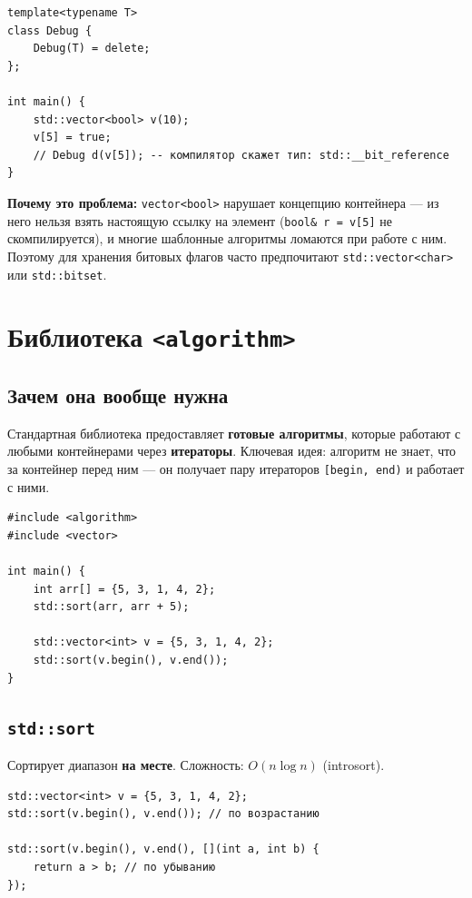 \documentclass[a4paper,12pt]{article}
\begin{document}
\begin{lstlisting}
template<typename T>
class Debug {
    Debug(T) = delete;
};

int main() {
    std::vector<bool> v(10);
    v[5] = true;
    // Debug d(v[5]); -- компилятор скажет тип: std::__bit_reference
}
\end{lstlisting}

\textbf{Почему это проблема:} \texttt{vector<bool>} нарушает концепцию
контейнера --- из него нельзя взять настоящую ссылку на элемент
(\texttt{bool\& r = v[5]} не скомпилируется), и многие шаблонные
алгоритмы ломаются при работе с ним. Поэтому для хранения битовых флагов
часто предпочитают \texttt{std::vector<char>} или \texttt{std::bitset}.

\newpage
\section{Библиотека \texttt{<algorithm>}}

\subsection{Зачем она вообще нужна}

Стандартная библиотека предоставляет \textbf{готовые алгоритмы},
которые работают с любыми контейнерами через \textbf{итераторы}.
Ключевая идея: алгоритм не знает, что за контейнер перед ним ---
он получает пару итераторов \texttt{[begin, end)} и работает с ними.

\begin{lstlisting}
#include <algorithm>
#include <vector>

int main() {
    int arr[] = {5, 3, 1, 4, 2};
    std::sort(arr, arr + 5);

    std::vector<int> v = {5, 3, 1, 4, 2};
    std::sort(v.begin(), v.end());
}
\end{lstlisting}

\subsection{\texttt{std::sort}}

Сортирует диапазон \textbf{на месте}. Сложность: $O(n \log n)$ (introsort).

\begin{lstlisting}
std::vector<int> v = {5, 3, 1, 4, 2};
std::sort(v.begin(), v.end()); // по возрастанию

std::sort(v.begin(), v.end(), [](int a, int b) {
    return a > b; // по убыванию
});
\end{lstlisting}
\end{document}
